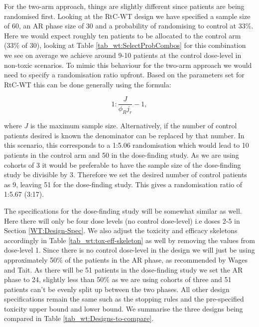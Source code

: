 For the two-arm approach, things are slightly different since patients are being randomised first. Looking at the RtC-WT design we have specified a sample size of 60, an AR phase size of 30 and a probability of randomising to control at 33\%. Here we would expect roughly ten patients to be allocated to the control arm (33\% of 30), looking at Table \ref{tab_wt:SelectProbCombos} for this combination we see on average we achieve around 9-10 patients at the control dose-level in non-toxic scenarios. To mimic this behaviour for the two-arm approach we would need to specify a randomisation ratio upfront. Based on the parameters set for RtC-WT this can be done generally using the formula:

\begin{equation}
	1 : \frac{J}{\phi_R j_r} - 1,
\end{equation}

where $J$ is the maximum sample size. Alternatively, if the number of control patients desired is known the denominator can be replaced by that number. In this scenario, this corresponds to a 1:5.06 randomisation which would lead to 10 patients in the control arm and 50 in the dose-finding study. As we are using cohorts of 3 it would be preferable to have the sample size of the dose-finding study be divisible by 3. Therefore we set the desired number of control patients as 9, leaving 51 for the dose-finding study. This gives a randomisation ratio of 1:5.67 (3:17). 

The specifications for the dose-finding study will be somewhat similar as well. Here there will only be four dose levels (no control dose-level) i.e doses 2-5 in Section \ref{WT:Design-Spec}. We also adjust the toxicity and efficacy skeletons accordingly in Table \ref{tab_wt:tox-eff-skeleton} as well by removing the values from dose-level 1. Since there is no control dose-level in the design we will just be using approximately 50\% of the patients in the AR phase, as recommended by Wages and Tait. As there will be 51 patients in the dose-finding study we set the AR phase to 24, slightly less than 50\% as we are using cohorts of three and 51 patients can't be evenly split up between the two phases. All other design specifications remain the same such as the stopping rules and the pre-specified toxicity upper bound and lower bound. We summarise the three designs being compared in Table \ref{tab_wt:Designs-to-compare}.

